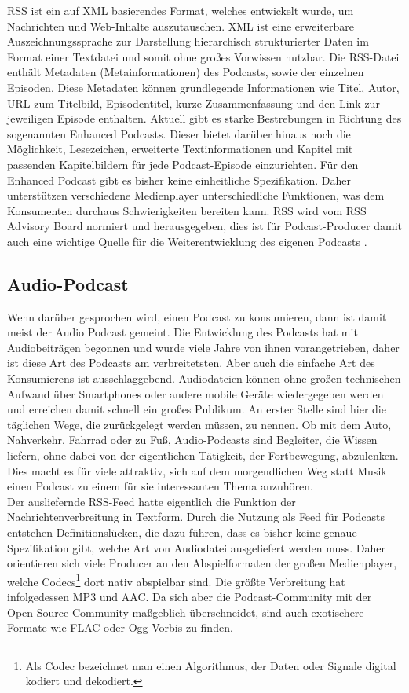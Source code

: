 \documentclass[11pt,a4paper]{scrreprt}
\begin{document}
\ac{RSS} ist ein auf \ac{XML} basierendes Format, welches entwickelt wurde, um Nachrichten und Web-Inhalte auszutauschen. \ac{XML} ist eine erweiterbare Auszeichnungssprache zur Darstellung hierarchisch strukturierter Daten im Format einer Textdatei und somit ohne großes Vorwissen nutzbar. Die \ac{RSS}-Datei enthält Metadaten (Metainformationen) des Podcasts, sowie der einzelnen Episoden. Diese Metadaten können grundlegende Informationen wie Titel, Autor, URL zum Titelbild, Episodentitel, kurze Zusammenfassung und den Link zur jeweiligen Episode enthalten. Aktuell gibt es starke Bestrebungen in Richtung des sogenannten Enhanced Podcasts. Dieser bietet darüber hinaus noch die Möglichkeit, Lesezeichen, erweiterte Textinformationen und Kapitel mit passenden Kapitelbildern für jede Podcast-Episode einzurichten. Für den Enhanced Podcast gibt es bisher keine einheitliche Spezifikation. Daher unterstützen verschiedene Medienplayer unterschiedliche Funktionen, was dem Konsumenten durchaus Schwierigkeiten bereiten kann. \ac{RSS} wird vom \ac{RSS} Advisory Board normiert und herausgegeben, dies ist für Podcast-Producer damit auch eine wichtige Quelle für die Weiterentwicklung des eigenen Podcasts \cite{RSSAB1999}.

\subsection{Audio-Podcast}
Wenn darüber gesprochen wird, einen Podcast zu konsumieren, dann ist damit meist der Audio Podcast gemeint. Die Entwicklung des Podcasts hat mit Audiobeiträgen begonnen und wurde viele Jahre von ihnen vorangetrieben, daher ist diese Art des Podcasts am verbreitetsten. Aber auch die einfache Art des Konsumierens ist ausschlaggebend. Audiodateien können ohne großen technischen Aufwand über Smartphones oder andere mobile Geräte wiedergegeben werden und erreichen damit schnell ein großes Publikum. An erster Stelle sind hier die täglichen Wege, die zurückgelegt werden müssen, zu nennen. Ob mit dem Auto, Nahverkehr, Fahrrad oder zu Fuß, Audio-Podcasts sind Begleiter, die Wissen liefern, ohne dabei von der eigentlichen Tätigkeit, der Fortbewegung, abzulenken. Dies macht es für viele attraktiv, sich auf dem morgendlichen Weg statt Musik einen Podcast zu einem für sie interessanten Thema anzuhören.\\
Der ausliefernde \ac{RSS}-Feed hatte eigentlich die Funktion der Nachrichtenverbreitung in Textform. Durch die Nutzung als Feed für Podcasts entstehen Definitionslücken, die dazu führen, dass es bisher keine genaue Spezifikation gibt, welche Art von Audiodatei ausgeliefert werden muss. Daher orientieren sich viele Producer an den Abspielformaten der großen Medienplayer, welche Codecs\footnote{Als Codec bezeichnet man einen Algorithmus, der Daten oder Signale digital kodiert und dekodiert.} dort nativ abspielbar sind. Die größte Verbreitung hat infolgedessen \ac{MP3} und \ac{AAC}. Da sich aber die Podcast-Community mit der Open-Source-Community maßgeblich überschneidet, sind auch exotischere Formate wie \ac{FLAC} oder \ac{Ogg Vorbis} zu finden.
\end{document}
